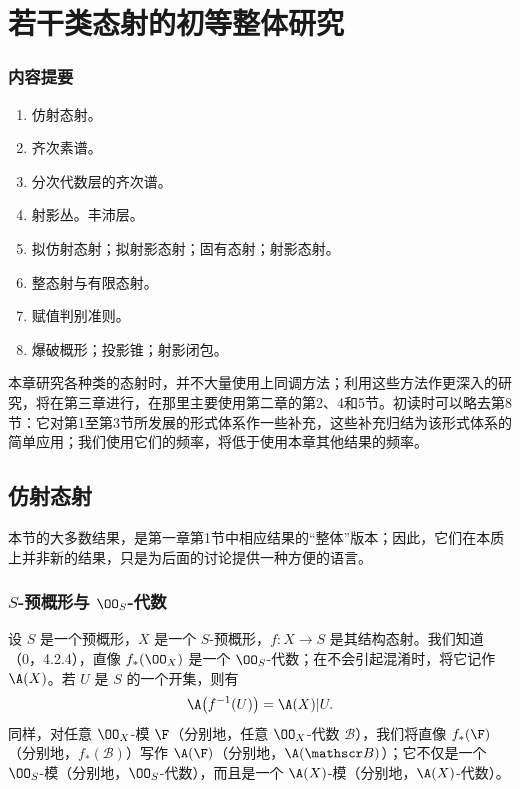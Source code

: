 \renewcommand{\B}{\mathscr B}
\setcounter{chapter}{1}

\chapter{若干类态射的初等整体研究}
\subsection*{内容提要}
\begin{enumerate}[label=\S\,\arabic*.]
\item 仿射态射。
\item 齐次素谱。
\item 分次代数层的齐次谱。
\item 射影丛。丰沛层。
\item 拟仿射态射；拟射影态射；固有态射；射影态射。
\item 整态射与有限态射。
\item 赋值判别准则。
\item 爆破概形；投影锥；射影闭包。
\end{enumerate}

本章研究各种类的态射时，并不大量使用上同调方法；利用这些方法作更深入的研究，将在第三章进行，在那里主要使用第二章的第2、4和5节。初读时可以略去第8节：它对第1至第3节所发展的形式体系作一些补充，这些补充归结为该形式体系的简单应用；我们使用它们的频率，将低于使用本章其他结果的频率。

\section{仿射态射}
本节的大多数结果，是第一章第1节中相应结果的“整体”版本；因此，它们在本质上并非新的结果，只是为后面的讨论提供一种方便的语言。

\subsection{\texorpdfstring{$S$-预概形与 $\OO_S$-代数}{S-预概形与结构层代数}}
设 $S$ 是一个预概形，$X$ 是一个 $S$-预概形，$f:X\to S$ 是其结构态射。我们知道（0，4.2.4），直像 $f_*(\OO_X)$ 是一个 $\OO_S$-代数；在不会引起混淆时，将它记作 $\A(X)$。若 $U$ 是 $S$ 的一个开集，则有
\[
\A\bigl(f^{-1}(U)\bigr)=\A(X)|U.
\]
同样，对任意 $\OO_X$-模 $\F$（分别地，任意 $\OO_X$-代数 $\B$），我们将直像 $f_*(\F)$（分别地，$f_*(\B)$）写作 $\A(\F)$（分别地，$\A(\B)$）；它不仅是一个 $\OO_S$-模（分别地，$\OO_S$-代数），而且是一个 $\A(X)$-模（分别地，$\A(X)$-代数）。

